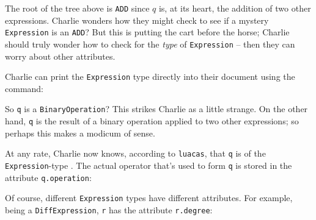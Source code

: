 \documentclass{article}
\begin{document}
The root of the tree above is \texttt{ADD} since $q$ is, at its heart, the addition of two other expressions. Charlie wonders how they might check to see if a mystery \texttt{Expression} is an \texttt{ADD}? But this is putting the cart before the horse; Charlie should truly wonder how to check for the \emph{type} of \texttt{Expression} -- then they can worry about other attributes. 

Charlie can print the \texttt{Expression} type directly into their document using the \texttt{\whatis} command:


So \texttt{q} is a \texttt{BinaryOperation}? This strikes Charlie as a little strange. On the other hand, \texttt{q} is the result of a binary operation applied to two other expressions; so perhaps this makes a modicum of sense. 

At any rate, Charlie now knows, according to \texttt{luacas}, that \texttt{q} is of the \texttt{Expression}-type . The actual operator that's used to form \texttt{q} is stored in the attribute \texttt{q.operation}:

    {
    }

Of course, different \texttt{Expression} types have different attributes. For example, being a \texttt{DiffExpression}, \texttt{r} has the attribute \texttt{r.degree}:

    {
    }
\end{document}
